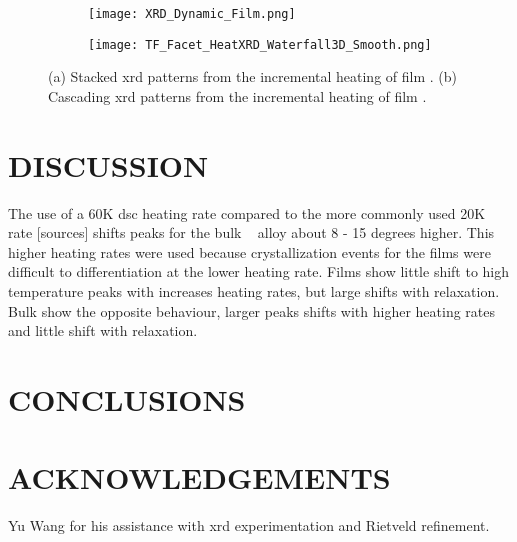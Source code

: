 \documentclass[draft,a4paper,12pt,oneside]{article}%
\begin{document}
\begin{figure}[b]
	\centering
	\begin{subfigure}[htbp]{0.75\textwidth}
		\texttt{[image: XRD\_Dynamic\_Film.png]}
		\caption{}
		\label{fig:XRD_Dynamic_FullStack_Film}
	\end{subfigure}
	\begin{subfigure}[htbp]{0.75\textwidth}
		\texttt{[image: TF\_Facet\_HeatXRD\_Waterfall3D\_Smooth.png]}
		\caption{}
		\label{fig:XRD_Dynamic_WaterFall_Film}
	\end{subfigure}
	\caption{(a) Stacked \gls{xrd} patterns from the incremental heating of film \MgZnCa. (b) Cascading \gls{xrd} patterns from the incremental heating of film \MgZnCa. }%
	\label{fig:XRD_Dynamic_Film}
\end{figure}


\section{DISCUSSION}

The use of a 60K \gls{dsc} heating rate compared to the more commonly used 20K rate [sources] shifts peaks for the bulk \MgZnCa~ alloy about 8 - 15 degrees higher. This higher heating rates were used because crystallization events for the films were difficult to differentiation at the lower heating rate. 
Films show little shift to high temperature peaks with increases heating rates, but large shifts with relaxation. 
Bulk show the opposite behaviour, larger peaks shifts with higher heating rates and little shift with relaxation.


\section{CONCLUSIONS}


\section{ACKNOWLEDGEMENTS}

Yu Wang for his assistance with \acrshort{xrd} experimentation and Rietveld refinement. 





\end{document}
